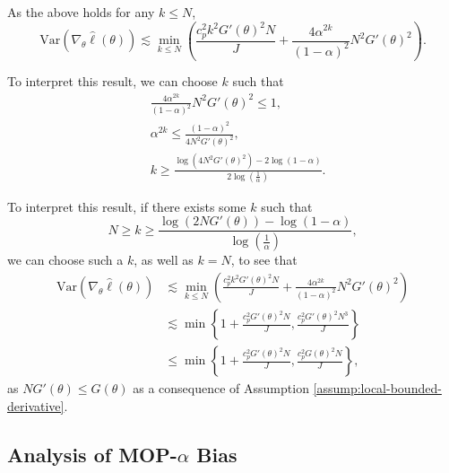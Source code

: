 \documentclass{article}
\begin{document}
As the above holds for any $k \leq N$,
$$\text{Var}(\nabla_\theta \hat\ell(\theta)) \lesssim \min_{k\leq N} \left(\frac{c_p^2k^2G'(\theta)^2N}{J} + \frac{4\alpha^{2k}}{(1-\alpha)^2}N^2G'(\theta)^2 \right).$$

To interpret this result, we can choose $k$ such that
\begin{align*}
    &\frac{4\alpha^{2k}}{(1-\alpha)^2}N^2G'(\theta)^2 \leq 1,\\
    &\alpha^{2k} \leq \frac{(1-\alpha)^2}{4N^2G'(\theta)^2},\\
    &k \geq \frac{\log\left(4N^2G'(\theta)^2\right)-2\log(1-\alpha)}{2\log\left(\frac{1}{\alpha}\right)}.
\end{align*}

To interpret this result, if there exists some $k$ such that $$N \geq k \geq \frac{\log\left(2NG'(\theta)\right)-\log(1-\alpha)}{\log\left(\frac{1}{\alpha}\right)},$$
we can choose such a $k$, as well as $k=N$, to see that
\begin{align*}
    \text{Var}(\nabla_\theta \hat\ell(\theta)) 
    &\lesssim \min_{k\leq N}\left(\frac{c_p^2k^2G'(\theta)^2N}{J} + \frac{4\alpha^{2k}}{(1-\alpha)^2}N^2G'(\theta)^2 \right)\\
    &\lesssim \min\left\{1+\frac{c_p^2G'(\theta)^2N}{J}, \frac{c_p^2G'(\theta)^2N^3}{J}\right\} \\
    &\leq \min\left\{1+\frac{c_p^2G'(\theta)^2N}{J}, \frac{c_p^2G(\theta)^2N}{J}\right\},
\end{align*}
as $NG'(\theta)\leq G(\theta)$ as a consequence of Assumption \ref{assump:local-bounded-derivative}.


\subsection{Analysis of MOP-$\alpha$ Bias}
\end{document}
